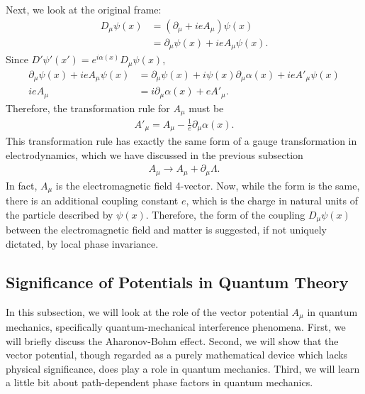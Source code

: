 \documentclass[a4paper,11pt]{article}
\numberwithin{equation}{section}
\theoremstyle{definition}
\newcommand{\p}{\partial}
\begin{document}
Next, we look at the original frame:
\begin{align*}
D_\mu \psi(x) &= \left(\p_\mu + ieA_\mu \right)\psi(x)\\
&= \p_\mu\psi(x) + ieA_\mu \psi(x).
\end{align*}
Since $D'\psi'(x') = e^{i\alpha(x)}D_\mu\psi(x)$,
\begin{align*}
\p_\mu\psi(x) + ieA_\mu \psi(x) &= \p_\mu \psi(x) + i\psi(x)\p_\mu \alpha(x) + ie A'_\mu \psi(x)\\
ieA_\mu &= i\p_\mu \alpha(x) + e A'_\mu.
\end{align*}
Therefore, the transformation rule for $A_\mu$ must be
\begin{align*}
A'_\mu = A_\mu - \frac{1}{e}\p_\mu\alpha(x).
\end{align*}
This transformation rule has exactly the same form of a gauge transformation in electrodynamics, which we have discussed in the previous subsection
\begin{align*}
A_\mu \to A_\mu + \p_\mu \Lambda.
\end{align*} 
In fact, $A_\mu$ is the electromagnetic field 4-vector. Now, while the form is the same, there is an additional coupling constant $e$, which is the charge in natural units of the particle described by $\psi(x)$. Therefore, the form of the coupling $D_\mu\psi(x)$ between the electromagnetic field and matter is suggested, if not uniquely dictated, by local phase invariance. 



\subsection{Significance of Potentials in Quantum Theory}
In this subsection, we will look at the role of the vector potential $A_\mu$ in quantum mechanics, specifically quantum-mechanical interference phenomena. First, we will briefly discuss the Aharonov-Bohm effect. Second, we will show that the vector potential, though regarded as a purely mathematical device which lacks physical significance, does play a role in quantum mechanics. Third, we will learn a little bit about path-dependent phase factors in quantum mechanics. 
\end{document}
